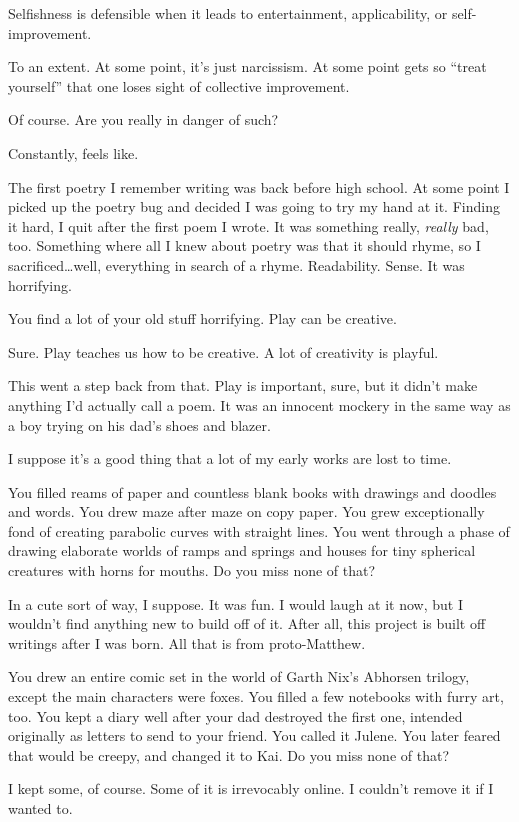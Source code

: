 \begin{ally}
Selfishness is defensible when it leads to entertainment, applicability, or self-improvement.
\end{ally}
To an extent. At some point, it's just narcissism. At some point gets so ``treat yourself'' that one loses sight of collective improvement.

\begin{ally}
Of course. Are you really in danger of such?
\end{ally}
Constantly, feels like.
\newpage

The first poetry I remember writing was back before high school. At some point I picked up the poetry bug and decided I was going to try my hand at it. Finding it hard, I quit after the first poem I wrote. It was something really, \emph{really} bad, too. Something where all I knew about poetry was that it should rhyme, so I sacrificed\ldots{}well, everything in search of a rhyme. Readability. Sense. It was horrifying.

\begin{ally}
You find a lot of your old stuff horrifying. Play can be creative.
\end{ally}
Sure. Play teaches us how to be creative. A lot of creativity is playful.

This went a step back from that. Play is important, sure, but it didn't make anything I'd actually call a poem. It was an innocent mockery in the same way as a boy trying on his dad's shoes and blazer.

I suppose it's a good thing that a lot of my early works are lost to time.

\begin{ally}
You filled reams of paper and countless blank books with drawings and doodles and words. You drew maze after maze on copy paper. You grew exceptionally fond of creating parabolic curves with straight lines. You went through a phase of drawing elaborate worlds of ramps and springs and houses for tiny spherical creatures with horns for mouths. Do you miss none of that?
\end{ally}
In a cute sort of way, I suppose. It was fun. I would laugh at it now, but I wouldn't find anything new to build off of it. After all, this project is built off writings after I was born. All that is from proto-Matthew.

\begin{ally}
You drew an entire comic set in the world of Garth Nix's Abhorsen trilogy, except the main characters were foxes. You filled a few notebooks with furry art, too. You kept a diary well after your dad destroyed the first one, intended originally as letters to send to your friend. You called it Julene. You later feared that would be creepy, and changed it to Kai. Do you miss none of that?
\end{ally}
I kept some, of course. Some of it is irrevocably online. I couldn't remove it if I wanted to.

